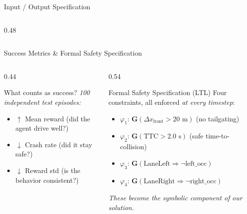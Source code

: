 \documentclass[aspectratio=169,10pt]{beamer}
\begin{document}
\begin{frame}{Input / Output Specification}
\begin{columns}[T]
\begin{column}{0.48\textwidth}
      \vspace{10pt}
    \end{column}
  \end{columns}
\end{frame}

\begin{frame}{Success Metrics \& Formal Safety Specification}
  \begin{columns}[T]
    \begin{column}{0.44\textwidth}
      \begin{block}{What counts as success?}
        \textit{100 independent test episodes:}
        \begin{itemize}[<2->]\small
          \item \(\uparrow\) Mean reward (did the agent drive well?)
          \item \(\downarrow\) Crash rate (did it stay safe?)
          \item \(\downarrow\) Reward std (is the behavior consistent?)
        \end{itemize}
      \end{block}
    \end{column}
    \begin{column}{0.54\textwidth}
      \pause
      \begin{alertblock}{Formal Safety Specification (LTL)}
        Four constraints, all enforced \textit{at every timestep}:
        \begin{itemize}[<+->]\small
          \item \textcolor{symbolicorange}{\(\varphi_1\)}: \(\mathbf{G}(\Delta x_\text{front} > 20\text{ m})\) (no tailgating)
          \item \textcolor{symbolicorange}{\(\varphi_2\)}: \(\mathbf{G}(\text{TTC} > 2.0\text{ s})\) (safe time-to-collision)
          \item \textcolor{symbolicorange}{\(\varphi_3\)}: \(\mathbf{G}(\text{LaneLeft} \Rightarrow \neg\text{left\_occ})\)
          \item \textcolor{symbolicorange}{\(\varphi_4\)}: \(\mathbf{G}(\text{LaneRight} \Rightarrow \neg\text{right\_occ})\)
        \end{itemize}
      \end{alertblock}
      \pause\vspace{4pt}
      {\small\textit{These become the symbolic component of our solution.}}
    \end{column}
  \end{columns}
\end{frame}
\end{document}
